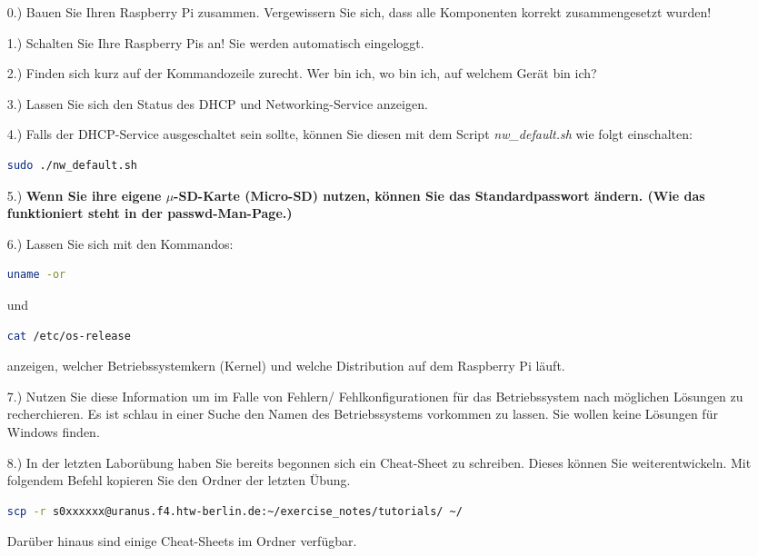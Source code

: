 \documentclass[paper=a4,fontsize=11pt]{scrartcl}%
\numberwithin{equation}{section}
\begin{document}
\begin{itemize}
	\item[0.)] Bauen Sie Ihren Raspberry Pi zusammen. Vergewissern Sie sich, dass alle Komponenten korrekt zusammengesetzt wurden!
	\item[1.)] Schalten Sie Ihre Raspberry Pis an! Sie werden automatisch eingeloggt.
	\item[2.)] Finden sich kurz auf der Kommandozeile zurecht. \glqq Wer bin ich, wo bin ich, auf welchem Gerät bin ich?\grqq
	\item[3.)] Lassen Sie sich den Status des DHCP und Networking-Service anzeigen.
	\item[4.)] Falls der DHCP-Service ausgeschaltet sein sollte, können Sie diesen mit dem Script \emph{nw\_default.sh} wie folgt einschalten:
	\begin{lstlisting}[style=Bash, language=Bash]
sudo ./nw_default.sh
		\end{lstlisting}	
	\item[5.)] \textbf{Wenn Sie ihre eigene $\mu$-SD-Karte (Micro-SD) nutzen, können Sie das Standardpasswort ändern. (Wie das funktioniert steht in der passwd-Man-Page.)}
	\item[6.)] Lassen Sie sich mit den Kommandos:
			\begin{lstlisting}[style=Bash, language=Bash]
uname -or
		\end{lstlisting} und
				\begin{lstlisting}[style=Bash, language=Bash]
cat /etc/os-release
		\end{lstlisting} anzeigen, welcher Betriebssystemkern (Kernel) und welche Distribution auf dem Raspberry Pi läuft.
	\item[7.)] Nutzen Sie diese Information um im Falle von Fehlern/ Fehlkonfigurationen für das Betriebssystem nach möglichen Lösungen zu recherchieren. Es ist schlau in einer Suche den Namen des Betriebssystems vorkommen zu lassen. Sie wollen keine Lösungen für Windows finden.
	\item[8.)] In der letzten Laborübung haben Sie bereits begonnen sich ein Cheat-Sheet zu schreiben. Dieses können Sie weiterentwickeln. Mit folgendem Befehl kopieren Sie den Ordner der letzten Übung. 
	\begin{lstlisting}[style=Bash, language=Bash]
scp -r s0xxxxxx@uranus.f4.htw-berlin.de:~/exercise_notes/tutorials/ ~/
		\end{lstlisting}
		Darüber hinaus sind einige Cheat-Sheets im Ordner  verfügbar.
\end{itemize}
	
\end{document}
